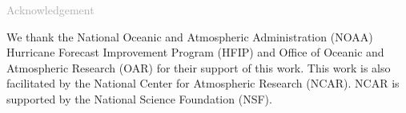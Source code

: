 \begin{titlepage}
\vspace*{0.5cm}
\noindent

\begin{flushleft}
\textcolor{darkgray}{\LARGE Acknowledgement}
\vspace*{1cm}\par

We thank the National Oceanic and Atmospheric Administration (NOAA) Hurricane Forecast Improvement Program (HFIP) and Office of Oceanic and Atmospheric Research (OAR) for their support of this work. This work is also facilitated by the National Center for Atmospheric Research (NCAR). NCAR is supported by the National Science Foundation (NSF).

\end{flushleft}
\end{titlepage}
\pagebreak{}




